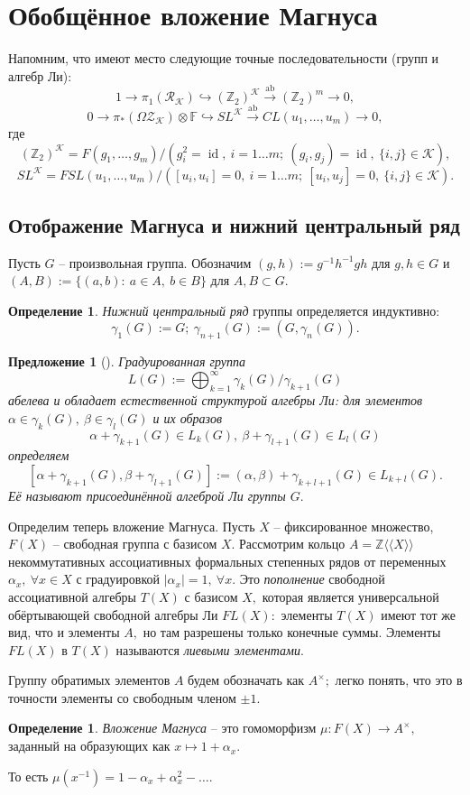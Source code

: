 \documentclass[10pt,a4paper]{article}
\DeclareMathOperator{\id}{id}
\DeclareMathOperator{\ab}{ab}
\def\ZZ{\mathbb{Z}}
\def\FF{\mathbb{F}}
\def\R{\mathcal{R}}
\def\Z{\mathcal{Z}}
\def\K{\mathcal{K}}
\def\ZK{\Z_\K}
\def\RK{\R_\K}
\def\OZK{\Omega\ZK}
\newtheorem{prp}[thm]{Предложение}
\theoremstyle{definition}
\newtheorem{dfn}[thm]{Определение}
\begin{document}
\section{Обобщённое вложение Магнуса}
Напомним, что имеют место следующие точные последовательности (групп и алгебр Ли):
$$1\to \pi_1(\RK)\hookrightarrow (\ZZ_2)^\K \overset{\ab}{\longrightarrow} (\ZZ_2)^m\to 0,$$
$$0\to \pi_*(\OZK)\otimes\FF\hookrightarrow SL^\K \overset{\ab}{\longrightarrow} CL(u_1,\dots,u_m)\to 0,$$
где
$$(\ZZ_2)^\K=F(g_1,\dots,g_m)/\left(g_i^2=\id,~i=1\dots m;~(g_i,g_j)=\id,~\{i,j\}\in\K\right),$$
$$SL^\K=FSL(u_1,\dots,u_m)/\left([u_i,u_i]=0,~i=1\dots m;~[u_i,u_j]=0,~\{i,j\}\in \K\right).$$
\subsection{Отображение Магнуса и нижний центральный ряд}
Пусть $G$ -- произвольная группа. Обозначим $(g,h):=g^{-1}h^{-1}gh$ для $g,h\in G$ и $(A,B):=\{(a,b):~a\in A,~b\in B\}$ для $A,B\subset G.$
\begin{dfn}
\emph{Нижний центральный ряд} группы определяется индуктивно: $$\gamma_1(G):=G;~\gamma_{n+1}(G):=(G,\gamma_n(G)).$$
\end{dfn}
\begin{prp}[\cite{magnus}] Градуированная группа
$$L(G):=\bigoplus_{k=1}^\infty \gamma_k(G)/\gamma_{k+1}(G)$$ абелева и обладает естественной структурой алгебры Ли: для элементов $\alpha\in\gamma_k(G),~\beta\in\gamma_l(G)$ и их образов
$$\alpha+\gamma_{k+1}(G)\in L_k(G),~\beta+\gamma_{l+1}(G)\in L_l(G)$$ определяем
$$[\alpha+\gamma_{k+1}(G),\beta+\gamma_{l+1}(G)] := (\alpha,\beta)+\gamma_{k+l+1}(G) \in L_{k+l}(G).$$ Её называют \emph{присоединённой алгеброй Ли} группы $G.$
\end{prp}
Определим теперь вложение Магнуса. Пусть $X$ -- фиксированное множество, $F(X)$ -- свободная группа с базисом $X.$ Рассмотрим кольцо $A=\ZZ\langle\!\langle X\rangle\!\rangle$ некоммутативных ассоциативных формальных степенных рядов от переменных $\alpha_x,~\forall x\in X$ с градуировкой $\boxed{|\alpha_x|=1,~\forall x.}$ Это \emph{пополнение} свободной ассоциативной алгебры $T(X)$ с базисом $X,$ которая является универсальной обёртывающей свободной алгебры Ли $FL(X):$ элементы $T(X)$ имеют тот же вид, что и элементы $A,$ но там разрешены только конечные суммы. Элементы $FL(X)$ в $T(X)$ называются \emph{лиевыми элементами}.

Группу обратимых элементов $A$ будем обозначать как $A^\times;$ легко понять, что это в точности элементы со свободным членом $\pm 1.$
\begin{dfn}
\emph{Вложение Магнуса} -- это гомоморфизм $\mu:F(X)\to A^\times,$ заданный на образующих как $x\mapsto 1+\alpha_x.$ 
\end{dfn}
То есть $\mu(x^{-1})=1-\alpha_x+\alpha_x^2-\dots.$
\end{document}
